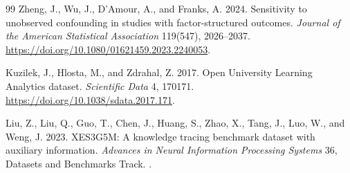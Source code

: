 \begin{thebibliography}{99}
Zheng, J., Wu, J., D'Amour, A., and Franks, A. 2024. Sensitivity to unobserved confounding in studies with factor-structured outcomes. \textit{Journal of the American Statistical Association} 119(547), 2026--2037. \url{https://doi.org/10.1080/01621459.2023.2240053}.

Kuzilek, J., Hlosta, M., and Zdrahal, Z. 2017. Open University Learning Analytics dataset. \textit{Scientific Data} 4, 170171. \url{https://doi.org/10.1038/sdata.2017.171}.

Liu, Z., Liu, Q., Guo, T., Chen, J., Huang, S., Zhao, X., Tang, J., Luo, W., and Weng, J. 2023. XES3G5M: A knowledge tracing benchmark dataset with auxiliary information. \textit{Advances in Neural Information Processing Systems} 36, Datasets and Benchmarks Track. .
\end{thebibliography}
